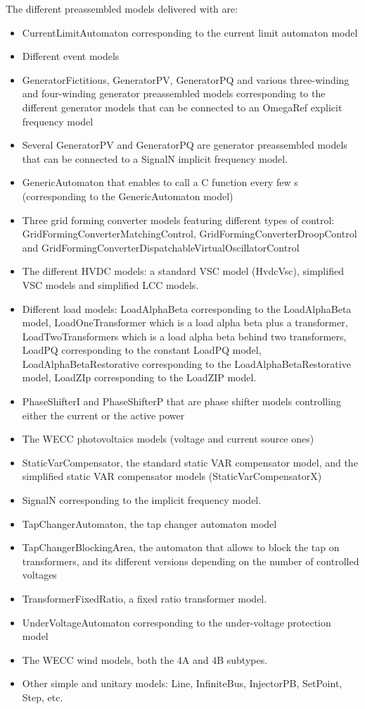 \documentclass[a4paper, 12pt]{report}
\begin{document}
The different preassembled models delivered with \Dynawo are:
\begin{itemize}
\item CurrentLimitAutomaton corresponding to the current limit automaton model
\item Different event models
\item GeneratorFictitious, GeneratorPV, GeneratorPQ and various three-winding and four-winding generator preassembled models corresponding to the different generator models that can be connected to an OmegaRef explicit frequency model
\item Several GeneratorPV and GeneratorPQ are generator preassembled models that can be connected to a SignalN implicit frequency model.
\item GenericAutomaton that enables to call a C function every few s (corresponding to the GenericAutomaton model)
\item Three grid forming converter models featuring different types of control: GridFormingConverterMatchingControl, GridFormingConverterDroopControl and GridFormingConverterDispatchableVirtualOscillatorControl
\item The different HVDC models: a standard VSC model (HvdcVsc), simplified VSC models and simplified LCC models.
\item Different load models: LoadAlphaBeta corresponding to the LoadAlphaBeta model, LoadOneTransformer which is a load alpha beta plus a transformer, LoadTwoTransformers which is a load alpha beta behind two transformers, LoadPQ corresponding to the constant LoadPQ model, LoadAlphaBetaRestorative corresponding to the LoadAlphaBetaRestorative model, LoadZIp corresponding to the LoadZIP model.
\item PhaseShifterI and PhaseShifterP that are phase shifter models controlling either the current or the active power
\item The \ac{WECC} photovoltaics models (voltage and current source ones)
\item StaticVarCompensator, the standard static VAR compensator model, and the simplified static VAR compensator models (StaticVarCompensatorX)
\item SignalN corresponding to the implicit frequency model.
\item TapChangerAutomaton, the tap changer automaton model
\item TapChangerBlockingArea, the automaton that allows to block the tap on transformers, and its different versions depending on the number of controlled voltages
\item TransformerFixedRatio, a fixed ratio transformer model.
\item UnderVoltageAutomaton corresponding to the under-voltage protection model
\item The \ac{WECC} wind models, both the 4A and 4B subtypes.
\item Other simple and unitary models: Line, InfiniteBus, InjectorPB, SetPoint, Step, etc.
\end{itemize}
\end{document}
